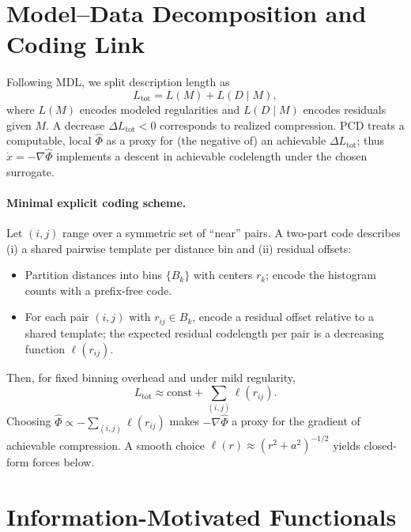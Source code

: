 \documentclass[11pt,a4paper]{article}
\numberwithin{equation}{section}
\begin{document}
\section{Model--Data Decomposition and Coding Link}
Following MDL, we split description length as
\begin{equation}
\label{eq:Ltot}
L_{\text{tot}} = L(M) + L(D\mid M),
\end{equation}
where $L(M)$ encodes modeled regularities and $L(D\mid M)$ encodes residuals given $M$. A decrease $\Delta L_{\text{tot}}<0$ corresponds to realized compression. PCD treats a computable, local $\widehat{\Phi}$ as a proxy for (the negative of) an achievable $\Delta L_{\text{tot}}$; thus $\dot x=-\nabla\widehat{\Phi}$ implements a descent in achievable codelength under the chosen surrogate.

\paragraph{Minimal explicit coding scheme.}
Let $(i,j)$ range over a symmetric set of ``near'' pairs. A two-part code describes (i) a shared pairwise template per distance bin and (ii) residual offsets:
\begin{itemize}
\item Partition distances into bins $\{B_k\}$ with centers $r_k$; encode the histogram counts with a prefix-free code.
\item For each pair $(i,j)$ with $r_{ij}\in B_k$, encode a residual offset relative to a shared template; the expected residual codelength per pair is a decreasing function $\ell(r_{ij})$.
\end{itemize}
Then, for fixed binning overhead and under mild regularity,
\begin{equation}
\label{eq:Ltotsum}
L_{\text{tot}} \approx \text{const} + \sum_{(i,j)} \ell(r_{ij}).
\end{equation}
Choosing $\widehat{\Phi}\propto -\sum_{(i,j)} \ell(r_{ij})$ makes $-\nabla\widehat{\Phi}$ a proxy for the gradient of achievable compression. A smooth choice $\ell(r)\approx (r^2+a^2)^{-1/2}$ yields closed-form forces below.

\section{Information-Motivated Functionals}
\end{document}
